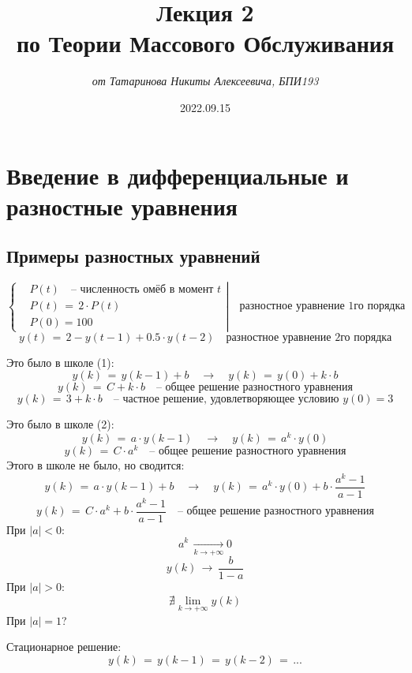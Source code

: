 \documentclass{article}
\title{\textbf{Лекция 2\\по Теории Массового Обслуживания}}
\author{\textit{от Татаринова Никиты Алексеевича, БПИ193}}
\date{2022.09.15}
\begin{document}
\maketitle
\section*{Введение в дифференциальные и разностные уравнения}
\subsection*{Примеры разностных уравнений}
\begin{equation*}
\left\{
\begin{aligned}
& P(t) \quad \text{-- численность омёб в момент } t \\
& P(t) \, = \, 2 \! \cdot \! P(t) \\
& P(0) \! = \! 100
\end{aligned}
\right| \quad \text{разностное уравнение 1го порядка} 
\end{equation*}
\[ y(t) \, = \, 2 \! - \! y(t \! - \! 1) \! \! + \! 0.5 \! \cdot \! y(t \! - \! 2) \quad \text{разностное уравнение 2го порядка} \]\par
Это было в школе (1):
\[ y(k) \, = \, y(k \! - \! 1) \! + \! b \quad \rightarrow \quad y(k) \, = \, y(0) \! + \! k \! \cdot \! b \]
\[ y(k) \, = \, C \! + \! k \! \cdot \! b \quad \text{-- общее решение разностного уравнения} \]
\[ y(k) \, = \, 3 \! + \! k \! \cdot \! b \quad \text{-- частное решение, удовлетворяющее условию } y(0) \! = \! 3 \]\par
Это было в школе (2):
\[ y(k) \, = \, a \! \cdot \! y(k \! - \! 1) \quad \rightarrow \quad y(k) \, = \, a^k \! \cdot \! y(0) \]
\[ y(k) \, = \, C \! \cdot \! a^k \quad \text{-- общее решение разностного уравнения} \]
Этого в школе не было, но сводится:
\[ y(k) \, = \, a \! \cdot \! y(k \! - \! 1) \! + \! b \quad \rightarrow \quad y(k) \, = \, a^k \! \cdot \! y(0) + b \! \cdot \! \dfrac{a^k \! - \! 1}{a \! - \! 1} \]
\[ y(k) \, = \, C \! \cdot \! a^k \! + \! b \! \cdot \! \dfrac{a^k \! - \! 1}{a \! - \! 1} \quad \text{-- общее решение разностного уравнения} \]
При $ |a| \! < \! 0 $:
\[ a^k \, \underset{k \rightarrow +\infty}{\longrightarrow} 0 \]
\[ y(k) \, \longrightarrow \, \dfrac{b}{1 \! - \! a}  \]
При $ |a| \! > \! 0 $:
\[ \nexists \lim\limits_{k \rightarrow +\infty} y(k) \]
При $ |a| \! = \! 1 $?\par
Стационарное решение:
\[ y(k) \, = \, y(k \! - \! 1) \, = \, y(k \! - \! 2) \, = \, ... \]
\end{document}

